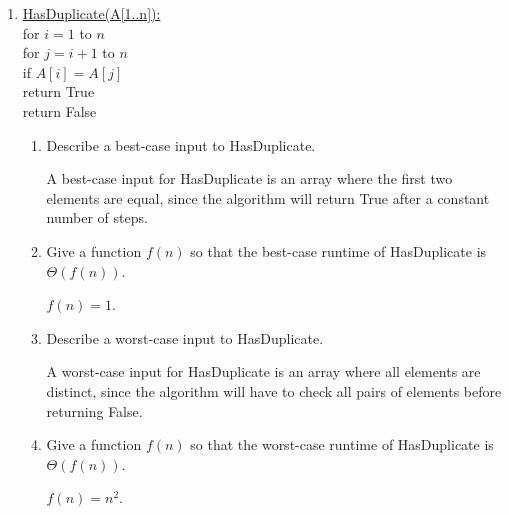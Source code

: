 \documentclass[11pt]{article}
\begin{document}
\begin{enumerate}
\begin{enumerate}
\begin{enumerate}
\begin{Solution}
    \end{Solution}
        \item Give a function $f(n)$ so that the worst-case runtime of IsPrime is $\Theta(f(n))$.
    \begin{Solution}
        $f(n) = \sqrt{n}$.
    \end{Solution}
    \end{enumerate}
    \item 
    \begin{algo}
        \underline{HasDuplicate(A[1..n]):}\\
        \> for $i = 1$ to $n$\\
        \> \> for $j = i+1$ to $n$\\
        \> \> \> if $A[i] = A[j]$\\
        \> \> \> \> return True\\
        \> return False
    \end{algo}
    \begin{enumerate}
        \item Describe a best-case input to HasDuplicate.
        \begin{Solution}
            A best-case input for HasDuplicate is an array where the first two
            elements are equal, since the algorithm will return True after a
            constant number of steps.
        \end{Solution}
        \item Give a function $f(n)$ so that the best-case runtime of HasDuplicate is $\Theta(f(n))$.
        \begin{Solution}
            $f(n) = 1$.
        \end{Solution}
        \item Describe a worst-case input to HasDuplicate.
        \begin{Solution}
            A worst-case input for HasDuplicate is an array where all elements
            are distinct, since the algorithm will have to check all pairs of
            elements before returning False.
        \end{Solution}
        \item Give a function $f(n)$ so that the worst-case runtime of HasDuplicate is $\Theta(f(n))$.
        \begin{Solution}
            $f(n) = n^2$.
        \end{Solution}
    \end{enumerate}
\end{enumerate}
    

\end{enumerate}
\end{document}
